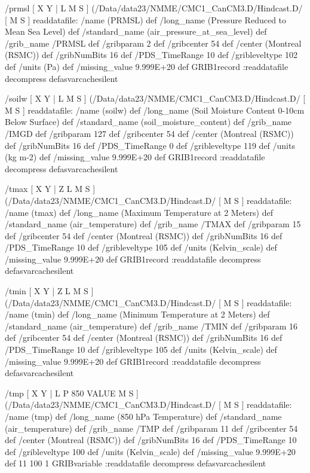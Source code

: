 \begin{ingrid}
/prmsl {
[ X Y | L M S ] (/Data/data23/NMME/CMC1_CanCM3.D/Hindcast.D/%
[ M S ]
readdatafile: 
/name (PRMSL) def
/long_name (Pressure Reduced to Mean Sea Level) def
/standard_name (air_pressure_at_sea_level) def
/grib_name /PRMSL def
/gribparam 2 def
/gribcenter 54 def
/center (Montreal (RSMC)) def
/gribNumBits 16 def
/PDS_TimeRange 10 def
/gribleveltype 102 def
/units (Pa) def
/missing_value 9.999E+20 def
GRIB1record
:readdatafile decompress
} defasvarcachesilent

/soilw {
[ X Y | L M S ]
(/Data/data23/NMME/CMC1_CanCM3.D/Hindcast.D/%
[ M S ]
readdatafile: 
/name (soilw) def
/long_name (Soil Moisture Content 0-10cm Below Surface) def
/standard_name (soil_moisture_content) def
/grib_name /IMGD def
/gribparam 127 def
/gribcenter 54 def
/center (Montreal (RSMC)) def
/gribNumBits 16 def
/PDS_TimeRange 0 def
/gribleveltype 119 def
/units (kg m-2) def
/missing_value 9.999E+20 def
GRIB1record
:readdatafile decompress
} defasvarcachesilent

/tmax {
[ X Y | Z L M S ]
(/Data/data23/NMME/CMC1_CanCM3.D/Hindcast.D/%
[ M S ]
readdatafile: 
/name (tmax) def
/long_name (Maximum Temperature at 2 Meters) def
/standard_name (air_temperature) def
/grib_name /TMAX def
/gribparam 15 def
/gribcenter 54 def
/center (Montreal (RSMC)) def
/gribNumBits 16 def
/PDS_TimeRange 10 def
/gribleveltype 105 def
/units (Kelvin_scale) def
/missing_value 9.999E+20 def
GRIB1record
:readdatafile decompress
} defasvarcachesilent

/tmin {
[ X Y | Z L M S ]
(/Data/data23/NMME/CMC1_CanCM3.D/Hindcast.D/%
[ M S ]
readdatafile: 
/name (tmin) def
/long_name (Minimum Temperature at 2 Meters) def
/standard_name (air_temperature) def
/grib_name /TMIN def
/gribparam 16 def
/gribcenter 54 def
/center (Montreal (RSMC)) def
/gribNumBits 16 def
/PDS_TimeRange 10 def
/gribleveltype 105 def
/units (Kelvin_scale) def
/missing_value 9.999E+20 def
GRIB1record
:readdatafile decompress
} defasvarcachesilent

/tmp {
[ X Y | L P 850 VALUE M S ]
(/Data/data23/NMME/CMC1_CanCM3.D/Hindcast.D/%
[ M S ]
readdatafile: 
/name (tmp) def
/long_name (850 hPa Temperature) def
/standard_name (air_temperature) def
/grib_name /TMP def
/gribparam 11 def
/gribcenter 54 def
/center (Montreal (RSMC)) def
/gribNumBits 16 def
/PDS_TimeRange 10 def
/gribleveltype 100 def
/units (Kelvin_scale) def
/missing_value 9.999E+20 def
11 100 1 GRIBvariable
:readdatafile decompress
} defasvarcachesilent


\end{ingrid}
